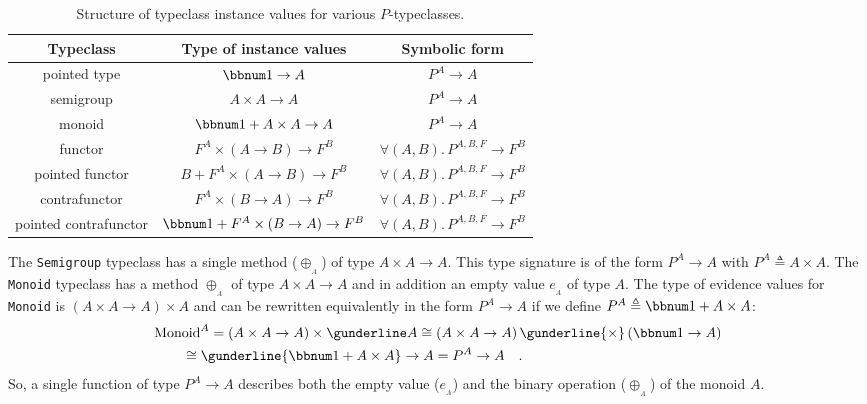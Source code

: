 \begin{table}
\begin{centering}
\begin{tabular}{|c|c|c|}
\hline 
\textbf{\small{}Typeclass} & \textbf{\small{}Type of instance values} & \textbf{\small{}Symbolic form}\tabularnewline
\hline 
\hline 
{\small{}pointed type} & {\small{}$\bbnum 1\rightarrow A$} & {\small{}$P^{A}\rightarrow A$}\tabularnewline
\hline 
{\small{}semigroup} & {\small{}$A\times A\rightarrow A$} & {\small{}$P^{A}\rightarrow A$}\tabularnewline
\hline 
{\small{}monoid} & {\small{}$\bbnum 1+A\times A\rightarrow A$} & {\small{}$P^{A}\rightarrow A$}\tabularnewline
\hline 
{\small{}functor} & {\small{}$F^{A}\times\left(A\rightarrow B\right)\rightarrow F^{B}$} & {\small{}$\forall(A,B).\,P^{A,B,F}\rightarrow F^{B}$}\tabularnewline
\hline 
{\small{}pointed functor} & {\small{}$B+F^{A}\times\left(A\rightarrow B\right)\rightarrow F^{B}$} & {\small{}$\forall(A,B).\,P^{A,B,F}\rightarrow F^{B}$}\tabularnewline
\hline 
{\small{}contrafunctor} & {\small{}$F^{A}\times(B\rightarrow A)\rightarrow F^{B}$} & {\small{}$\forall(A,B).\,P^{A,B,F}\rightarrow F^{B}$}\tabularnewline
\hline 
{\small{}pointed contrafunctor} & {\small{}$\bbnum 1+F^{A}\times\left(B\rightarrow A\right)\rightarrow F^{B}$} & {\small{}$\forall(A,B).\,P^{A,B,F}\rightarrow F^{B}$}\tabularnewline
\hline 
\end{tabular}
\par\end{centering}
\caption{Structure of typeclass instance values for various $P$-typeclasses.\label{tab:Types-of-typeclass-instance-values}}
\end{table}

The \lstinline!Semigroup! typeclass has a single method ($\oplus_{_{A}}$)
of type $A\times A\rightarrow A$. This type signature is of the form
$P^{A}\rightarrow A$ with $P^{A}\triangleq A\times A$. The \lstinline!Monoid!
typeclass has a method $\oplus_{_{A}}$ of type $A\times A\rightarrow A$
and in addition an empty value $e_{_{A}}$ of type $A$. The type
of evidence values for \lstinline!Monoid! is $(A\times A\rightarrow A)\times A$
and can be rewritten equivalently in the form $P^{A}\rightarrow A$
if we define $P^{A}\triangleq\bbnum 1+A\times A$:
\begin{align*}
 & \text{Monoid}^{A}=\left(A\times A\rightarrow A\right)\times\gunderline A\cong\left(A\times A\rightarrow A\right)\gunderline{\times}\,(\bbnum 1\rightarrow A)\\
 & \quad\quad\cong\gunderline{\bbnum 1+A\times A}\rightarrow A=P^{A}\rightarrow A\quad.
\end{align*}
So, a single function of type $P^{A}\rightarrow A$ describes both
the empty value ($e_{_{A}}$) and the binary operation ($\oplus_{_{A}}$)
of the monoid $A$.

